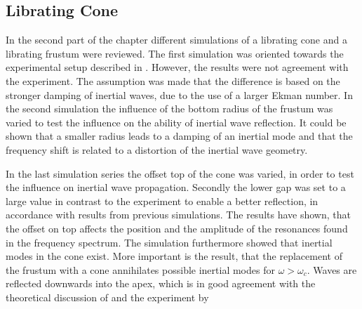 \subsection{Librating Cone}

In the second part of the chapter different simulations of
a librating cone and a librating frustum were reviewed.
The first simulation was oriented towards the experimental setup described in \citep{Beardsley1970}.
However, the results  were not agreement with the experiment.
The assumption was made that the difference is based on the  stronger damping of inertial waves,
due to the use of a larger Ekman number.
In the second simulation the influence of the bottom radius of the frustum was varied
to test the influence on the ability of inertial wave reflection.
It could be shown that a smaller radius leads to a damping of an inertial mode and that the frequency
shift is related to a distortion of the inertial wave geometry.

In the last simulation series  the offset top of the cone was varied, in order to test the influence on
inertial wave propagation. Secondly the lower gap was set to a large value in contrast to the experiment
to enable a better reflection, in accordance with results from previous simulations.
The results have shown, that the offset on top affects the position and the amplitude of the resonances
found in the frequency spectrum.
The simulation furthermore showed that inertial modes in the cone exist.
More important is the result, that the replacement of the frustum with a cone annihilates possible
inertial modes for $\omega > \omega_c$.
Waves are reflected downwards into the apex, which is in good agreement with the
theoretical discussion of \citep{Greenspan1969} and the experiment by \citep{Beardsley1970}

